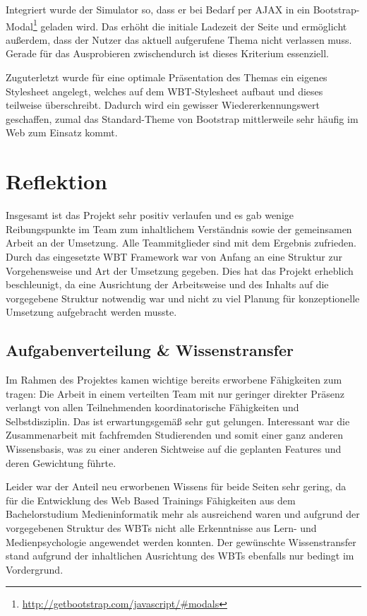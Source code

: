 \documentclass{article}
\begin{document}
Integriert wurde der Simulator so, dass er bei Bedarf per AJAX in ein Bootstrap-Modal\footnote{\url{http://getbootstrap.com/javascript/\#modals}} geladen wird. Das erh\"oht die initiale Ladezeit der Seite und erm\"oglicht außerdem, dass der Nutzer das aktuell aufgerufene Thema nicht verlassen muss. Gerade f\"ur das Ausprobieren zwischendurch ist dieses Kriterium essenziell.

Zuguterletzt wurde f\"ur eine optimale Pr\"asentation des Themas ein eigenes Stylesheet angelegt, welches auf dem WBT-Stylesheet aufbaut und dieses teilweise \"uberschreibt. Dadurch wird ein gewisser Wiedererkennungswert geschaffen, zumal das Standard-Theme von Bootstrap mittlerweile sehr h\"aufig im Web zum Einsatz kommt. 

\section{Reflektion}
\label{sec:reflektion}
Insgesamt ist das Projekt sehr positiv verlaufen und es gab wenige Reibungspunkte im Team zum inhaltlichem Verst\"andnis sowie der gemeinsamen Arbeit an der Umsetzung. Alle Teammitglieder sind mit dem Ergebnis zufrieden. Durch das eingesetzte WBT Framework war von Anfang an eine Struktur zur Vorgehensweise und Art der Umsetzung gegeben. Dies hat das Projekt erheblich beschleunigt, da eine Ausrichtung der Arbeitsweise und des Inhalts auf die vorgegebene Struktur notwendig war und nicht zu viel Planung f\"ur konzeptionelle Umsetzung aufgebracht werden musste.

\subsection{Aufgabenverteilung \& Wissenstransfer}
Im Rahmen des Projektes kamen wichtige bereits erworbene F\"ahigkeiten zum tragen: Die Arbeit in einem verteilten Team mit nur geringer direkter Pr\"asenz verlangt von allen Teilnehmenden koordinatorische F\"ahigkeiten und Selbstdisziplin. Das ist erwartungsgem\"aß sehr gut gelungen. Interessant war die Zusammenarbeit mit fachfremden Studierenden und somit einer ganz anderen Wissensbasis, was zu einer anderen Sichtweise auf die geplanten Features und deren Gewichtung f\"uhrte.

Leider war der Anteil neu erworbenen Wissens f\"ur beide Seiten sehr gering, da f\"ur die Entwicklung des Web Based Trainings F\"ahigkeiten aus dem Bachelorstudium Medieninformatik mehr als ausreichend waren und aufgrund der vorgegebenen Struktur des WBTs nicht alle Erkenntnisse aus Lern- und Medienpsychologie angewendet werden konnten. Der gew\"unschte Wissenstransfer stand aufgrund der inhaltlichen Ausrichtung des WBTs ebenfalls nur bedingt im Vordergrund.
\end{document}
